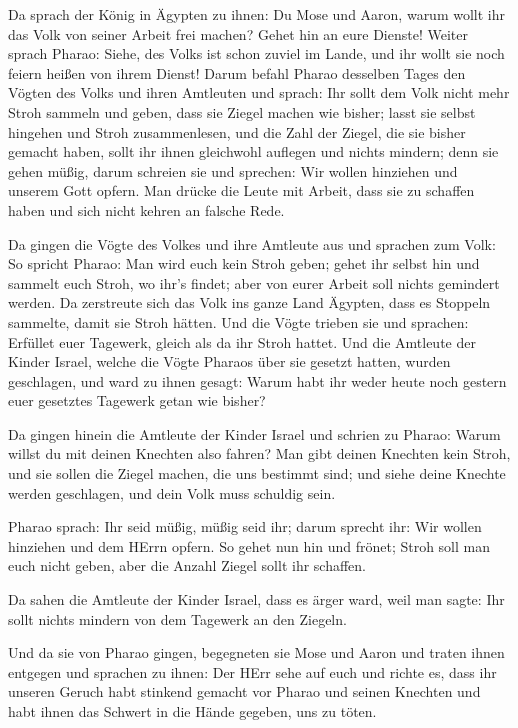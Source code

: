  Da sprach der König in Ägypten zu ihnen: Du Mose und Aaron,
warum wollt ihr das Volk von seiner Arbeit frei machen? Gehet hin an
eure Dienste!  Weiter sprach Pharao: Siehe, des Volks ist
schon zuviel im Lande, und ihr wollt sie noch feiern heißen von ihrem
Dienst!  Darum befahl Pharao desselben Tages den Vögten des
Volks und ihren Amtleuten und sprach:  Ihr sollt dem Volk
nicht mehr Stroh sammeln und geben, dass sie Ziegel machen wie bisher;
lasst sie selbst hingehen und Stroh zusammenlesen,  und die
Zahl der Ziegel, die sie bisher gemacht haben, sollt ihr ihnen
gleichwohl auflegen und nichts mindern; denn sie gehen müßig, darum
schreien sie und sprechen: Wir wollen hinziehen und unserem Gott opfern.
 Man drücke die Leute mit Arbeit, dass sie zu schaffen haben
und sich nicht kehren an falsche Rede.

 Da gingen die Vögte des Volkes und ihre Amtleute aus und
sprachen zum Volk: So spricht Pharao: Man wird euch kein Stroh geben;
 gehet ihr selbst hin und sammelt euch Stroh, wo ihr's
findet; aber von eurer Arbeit soll nichts gemindert werden.
 Da zerstreute sich das Volk ins ganze Land Ägypten, dass
es Stoppeln sammelte, damit sie Stroh hätten.  Und die
Vögte trieben sie und sprachen: Erfüllet euer Tagewerk, gleich als da
ihr Stroh hattet.  Und die Amtleute der Kinder Israel,
welche die Vögte Pharaos über sie gesetzt hatten, wurden geschlagen, und
ward zu ihnen gesagt: Warum habt ihr weder heute noch gestern euer
gesetztes Tagewerk getan wie bisher?

 Da gingen hinein die Amtleute der Kinder Israel und
schrien zu Pharao: Warum willst du mit deinen Knechten also fahren?
 Man gibt deinen Knechten kein Stroh, und sie sollen die
Ziegel machen, die uns bestimmt sind; und siehe deine Knechte werden
geschlagen, und dein Volk muss schuldig sein.

 Pharao sprach: Ihr seid müßig, müßig seid ihr; darum
sprecht ihr: Wir wollen hinziehen und dem HErrn opfern.  So
gehet nun hin und frönet; Stroh soll man euch nicht geben, aber die
Anzahl Ziegel sollt ihr schaffen.

 Da sahen die Amtleute der Kinder Israel, dass es ärger
ward, weil man sagte: Ihr sollt nichts mindern von dem Tagewerk an den
Ziegeln.

 Und da sie von Pharao gingen, begegneten sie Mose und
Aaron und traten ihnen entgegen  und sprachen zu ihnen: Der
HErr sehe auf euch und richte es, dass ihr unseren Geruch habt stinkend
gemacht vor Pharao und seinen Knechten und habt ihnen das Schwert in die
Hände gegeben, uns zu töten.

